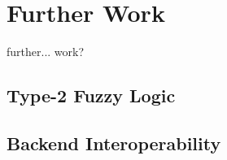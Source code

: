 \section{Further Work}
{\color{red}further... work?}

\subsection{Type-2 Fuzzy Logic}
\label{sec:type2}

\subsection{Backend Interoperability}